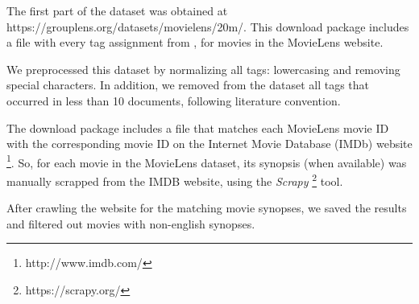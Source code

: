 The first part of the dataset was obtained at https://grouplens.org/datasets/movielens/20m/. This download package includes a file with every tag assignment from , for movies in the MovieLens website.

We preprocessed this dataset by normalizing all tags: lowercasing and removing special characters. In addition, we removed from the dataset all tags that occurred in less than 10 documents, following literature convention.

The download package includes a file that matches each MovieLens movie ID with the corresponding movie ID on the Internet Movie Database (IMDb) website \footnote{http://www.imdb.com/}. So, for each movie in the MovieLens dataset, its synopsis (when available) was manually scrapped from the IMDB website, using the \textit{Scrapy} \footnote{https://scrapy.org/} tool.

After crawling the website for the matching movie synopses, we saved the results and filtered out movies with non-english synopses.